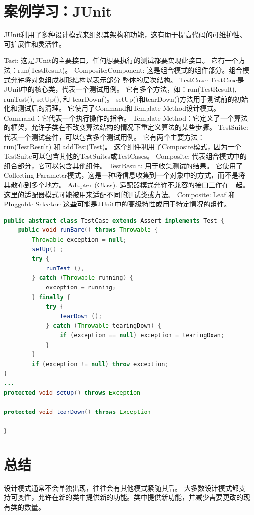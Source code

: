 \section{案例学习：JUnit}

JUnit利用了多种设计模式来组织其架构和功能，这有助于提高代码的可维护性、可扩展性和灵活性。

Test:
这是JUnit的主要接口，任何想要执行的测试都要实现此接口。
它有一个方法：run(TestResult)。
Composite:Component:
这是组合模式的组件部分。组合模式允许将对象组成树形结构以表示部分-整体的层次结构。
TestCase:
TestCase是JUnit中的核心类，代表一个测试用例。
它有多个方法，如：run(TestResult), runTest(), setUp(), 和 tearDown()。
setUp()和tearDown()方法用于测试前的初始化和测试后的清理。
它使用了Command和Template Method设计模式。
Command：它代表一个执行操作的指令。
Template Method：它定义了一个算法的框架，允许子类在不改变算法结构的情况下重定义算法的某些步骤。
TestSuite:
代表一个测试套件，可以包含多个测试用例。
它有两个主要方法：run(TestResult) 和 addTest(Test)。
这个组件利用了Composite模式，因为一个TestSuite可以包含其他的TestSuites或TestCases。
Composite:
代表组合模式中的组合部分，它可以包含其他组件。
TestResult:
用于收集测试的结果。
它使用了Collecting Parameter模式，这是一种将信息收集到一个对象中的方式，而不是将其散布到多个地方。
Adapter (Class):
适配器模式允许不兼容的接口工作在一起。这里的适配器模式可能被用来适配不同的测试类或方法。
Composite: Leaf 和 Pluggable Selector:
这些可能是JUnit中的高级特性或用于特定情况的组件。

\begin{lstlisting}[language=Java, caption=JUnit Case Study Example, label=lst:junit_case_study]
public abstract class TestCase extends Assert implements Test {
	public void runBare() throws Throwable {
		Throwable exception = null;
		setUp() ;
		try {
			runTest ();
		} catch (Throwable running) {
			exception = running;
		} finally {
			try {
				tearDown ();
			} catch (Throwable tearingDown) {
				if (exception == null) exception = tearingDown;
			}
		}
		if (exception != null) throw exception;
}
...
protected void setUp() throws Exception

protected void tearDown() throws Exception

}
\end{lstlisting}

\section{总结}
设计模式通常不会单独出现，往往会有其他模式紧随其后。
大多数设计模式都支持可变性，允许在新的类中提供新的功能。类中提供新功能，并减少需要更改的现有类的数量。
































